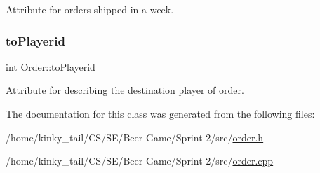 Attribute for orders shipped in a week. 

\mbox{\label{class_order_a0dd2d933c8d7749a9f1d8d40e4424ab7}} 
\subsubsection{\texorpdfstring{to\+Playerid}{toPlayerid}}
{\footnotesize\ttfamily int Order\+::to\+Playerid\hspace{0.3cm}{\ttfamily [private]}}



Attribute for describing the destination player of order. 



The documentation for this class was generated from the following files\+:\begin{DoxyCompactItemize}
\item 
/home/kinky\+\_\+tail/\+C\+S/\+S\+E/\+Beer-\/\+Game/\+Sprint 2/src/\hyperlink{order_8h}{order.\+h}\item 
/home/kinky\+\_\+tail/\+C\+S/\+S\+E/\+Beer-\/\+Game/\+Sprint 2/src/\hyperlink{order_8cpp}{order.\+cpp}\end{DoxyCompactItemize}
